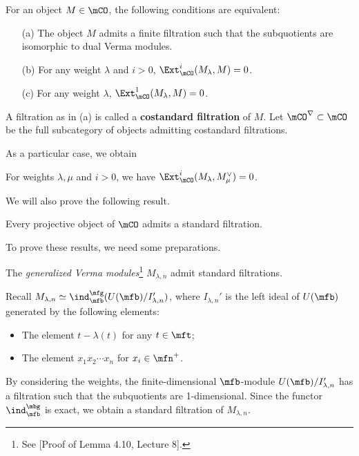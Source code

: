 	\begin{thmdefn}
		For an object $M \in \mCO$, the following conditions are equivalent:
		\begin{itemize}
			\item[(a)]
				The object $M$ admits a finite filtration such that the subquotients are isomorphic to dual Verma modules.
			\item[(b)]
				For any weight $\lambda$ and $i>0$, $\Ext_\mCO^i(M_\lambda,M) = 0$.
			\item[(c)]
				For any weight $\lambda$, $\Ext_\mCO^1(M_\lambda,M) = 0$.
		\end{itemize}
		A filtration as in (a) is called a \textbf{costandard filtration} of $M$. Let $\mCO^\nabla\subset \mCO$ be the full subcategory of objects admitting costandard filtrations.
	\end{thmdefn}

	As a particular case, we obtain

	\begin{cor}
		\label{cor-orthogonal-Ext}
		For weights $\lambda,\mu$ and $i>0$, we have $\Ext_\mCO^i(M_\lambda,M_\mu^\vee) = 0$.
	\end{cor}

	We will also prove the following result.

	\begin{thm}
		\label{thm-proj-stadard-fil}
		Every projective object of $\mCO$ admits a standard filtration.
	\end{thm}

	To prove these results, we need some preparations.

	\begin{lem}
		\label{lem-gen-Verma-standard-fil}
		The \emph{generalized Verma modules}\footnote{See [Proof of Lemma 4.10, Lecture 8].} $M_{\lambda,n}$ admit standard filtrations.
	\end{lem}

	\proof
		Recall $M_{\lambda,n}\simeq \ind_\mfb^\mfg( U(\mfb)/ I_{\lambda,n}' )$, where $I_{\lambda,n}' $ is the left ideal of $U(\mfb)$ generated by the following elements:
		\begin{itemize}
			\item The element $t-\lambda(t)$ for any $t\in \mft$;
			\item The element $x_1x_2\cdots x_n$ for $x_i \in \mfn^+$.
		\end{itemize}
		By considering the weights, the finite-dimensional $\mfb$-module $U(\mfb)/ I_{\lambda,n}'$ has a filtration such that the subquotients are 1-dimensional. Since the functor $\ind_\mfb^\mbg$ is exact, we obtain a standard filtration of $M_{\lambda,n}$.

